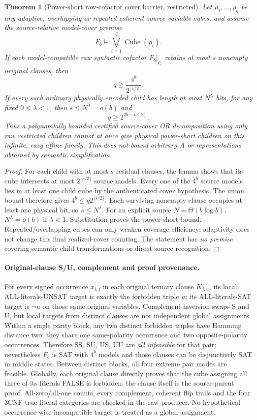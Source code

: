 \documentclass[11pt]{article}
\newtheorem{theorem}{Theorem}
\begin{document}
\begin{theorem}[Power-short raw-cofactor cover barrier, restricted]
Let $\rho_1,\ldots,\rho_q$ be any adaptive, overlapping or repeated coherent source-variable cubes, and assume the \emph{source-relative model-cover premise}
\[
F_b\models\bigvee_{i=1}^q\operatorname{Cube}(\rho_i).
\]
If each model-compatible raw syntactic cofactor $F_b|_{\rho_i}$ retains at most $s$ nonempty original clauses, then
\[
\boxed{q\ge\frac{4^b}{2^{\lfloor s/2\rfloor}}.}
\]
If every such ordinary physically encoded child has length at most $N^\lambda$ bits, for any fixed $0\le\lambda<1$, then $s\le N^\lambda=o(b)$ and
\[
\boxed{q\ge2^{2b-o(b)}.}
\]
Thus a polynomially bounded \emph{certified source-cover OR decomposition using only raw restricted children} cannot at once give physical power-short children on this infinite, easy affine family. This does not bound arbitrary $A$ or representations obtained by semantic simplification.
\end{theorem}
\begin{proof}
For each child with at most $s$ residual clauses, the lemma shows that its cube intersects at most $2^{\lfloor s/2\rfloor}$ source models. Every one of the $4^b$ source models lies in at least one child cube by the authenticated cover hypothesis. The union bound therefore gives $4^b\le q2^{\lfloor s/2\rfloor}$. Each surviving nonempty clause occupies at least one physical bit, so $s\le N^\lambda$. For an explicit source $N=\Theta(b\log b)$, $N^\lambda=o(b)$ if $\lambda<1$. Substitution proves the power-short bound. Repeated/overlapping cubes can only weaken coverage efficiency; adaptivity does not change this final realized-cover counting. The statement has \emph{no premise} covering semantic child transformations or direct source recognition.
\end{proof}

\paragraph{Original-clause S/U, complement and proof provenance.}
For every signed occurrence $x_{i,j}$ in each original ternary clause $K_{j,u}$, its local ALL-literals-UNSAT target is exactly the forbidden triple $u$; its ALL-literals-SAT target is $\neg u$ on those same original variables. Complement inversion swaps S and U, but local targets from distinct clauses are not independent global assignments. Within a single parity block, any two distinct forbidden triples have Hamming distance two: they share one same-polarity occurrence and two opposite-polarity occurrences. Therefore SS, SU, US, UU are \emph{all infeasible} for that pair; nevertheless $F_b$ is SAT with $4^b$ models and those clauses can be disjunctively SAT in middle states. Between distinct blocks, all four extreme pair modes are feasible. Globally, each original clause directly proves that the cube assigning all three of its literals FALSE is forbidden: the clause itself is the source-parent proof. All-zero/all-one counts, every complement, coherent flip trails and the four 3CNF true-literal categories are checked in the raw producer. No hypothetical occurrence-wise incompatible target is treated as a global assignment.
\end{document}
